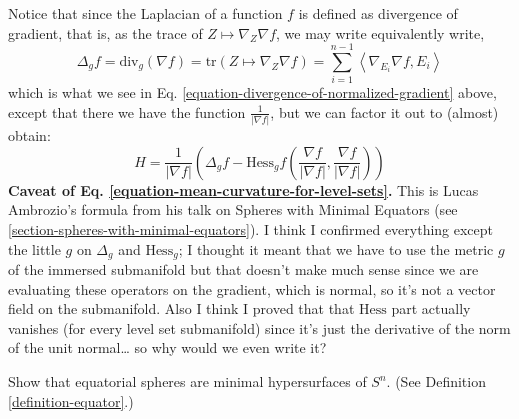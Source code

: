 Notice that since the Laplacian of a function $f$ is defined as divergence of
gradient, that is, as the trace of $Z\mapsto \nabla_Z\nabla f$, 
we may write equivalently
write,
\begin{equation}
\label{equation-immersion-Laplacian}
\Delta_g f=\text{div}_g(\nabla f)=\text{tr}(Z \mapsto \nabla_Z\nabla f)
=\sum_{i=1}^{n-1}\left<\nabla_{E_i}\nabla f,E_i\right>
\end{equation}
which is what we see in Eq. 
\ref{equation-divergence-of-normalized-gradient} above, except that there we
have the function $\frac{1}{|\nabla f|}$, but we can factor it out to (almost)
obtain:
\begin{equation}
\label{equation-mean-curvature-for-level-sets}
H=\frac{1}{|\nabla f|}\left(\Delta_g f-\text{Hess}_gf
\left(\frac{\nabla f}{|\nabla f|},\frac{\nabla f}{|\nabla f|}\right)\right)
\end{equation}
{\bf Caveat of Eq. \ref{equation-mean-curvature-for-level-sets}.} This is
Lucas Ambrozio's formula from his talk on Spheres with Minimal Equators (see
\ref{section-spheres-with-minimal-equators}). I think I confirmed everything
except the little $g$ on $\Delta_g$ and 
$\text{Hess}_g$; I thought it meant that we have to use the metric $g$ of the
immersed submanifold but that doesn't make much sense since we are evaluating
these operators on the gradient, which is normal, so it's not a vector field on
the submanifold. Also I
think I proved that that $\text{Hess}$ part actually vanishes (for every level
set submanifold) since it's just
the derivative of the norm of the unit normal… so why would we even write it?

\begin{example}
\label{example-equatorial-spheres}
Show that equatorial spheres are minimal hypersurfaces of $S^n$. (See 
Definition \ref{definition-equator}.)
\end{example}


